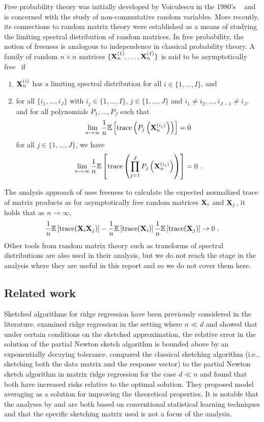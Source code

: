 Free probability theory was initially developed by Voiculescu in the 1980's ~\citep{Anderson:2009} and is concerned with the study of non-commutative random variables. More recently, its connections to random matrix theory were established as a means of studying the limiting spectral distribution of random matrices. In free probability, the notion of freeness is analogous to independence in classical probability theory. A family of random $n\times n$ matrices $\{\mathbf{X}_n^{(1)},\ldots,\mathbf{X}_n^{(I)}\}$ is said to be asymptotically free~\citep{Couillet:2011_free} if
\begin{enumerate}
\item
$\mathbf{X}_n^{(i)}$ has a limiting spectral distribution for all $i\in\{1,\ldots,I\}$, and
\item
for all $\{i_1,\ldots,i_J\}$ with $i_j\in\{1,\ldots,I\}$, $j\in\{1,\ldots,J\}$ and $i_1\neq i_2,\ldots,i_{J-1}\neq i_J$, and for all polynomials $P_1,\ldots,P_J$ such that
\[
\lim_{n\rightarrow\infty} \frac{1}{n}\mathbb{E}\left[\mathrm{trace}\left(P_j\left(\mathbf{X}_n^{(i_j)}\right)\right)\right] = 0
\]
for all $j\in\{1,\ldots,J\}$, we have
\[
\lim_{n\rightarrow\infty} \frac{1}{n}\mathbb{E}\left[\mathrm{trace}\left(\prod_{j=1}^JP_j\left(\mathbf{X}_n^{(i_j)}\right)\right)\right] = 0 \;.
\]
\end{enumerate}
The analysis approach of \citet{Lacotte:2020} uses freeness to calculate the expected normalized trace of matrix products as for asymptotically free random matrices $\mathbf{X}_i$ and $\mathbf{X}_j$, it holds that as $n\rightarrow\infty$,
\[
\frac{1}{n}\mathbb{E}\left[\mathrm{trace}(\mathbf{X}_i\mathbf{X}_j)\right] - \frac{1}{n}\mathbb{E}\left[\mathrm{trace}(\mathbf{X}_i)\right]\frac{1}{n}\mathbb{E}\left[\mathrm{trace}(\mathbf{X}_j)\right] \rightarrow 0 \;.
\]
Other tools from random matrix theory such as transforms of spectral distributions are also used in their analysis, but we do not reach the stage in the analysis where they are useful in this report and so we do not cover them here. \todo


\subsection{Related work} \label{sec:literature}

Sketched algorithms for ridge regression have been previously considered in the literature. \citet{Chowdhury:2018} examined ridge regression in the setting where $n\ll d$ and showed that under certain conditions on the sketched approximation, the relative error in the solution of the partial Newton sketch algorithm is bounded above by an exponentially decaying tolerance. \citet{Wang:2017} compared the classical sketching algorithm (i.e., sketching both the data matrix and the response vector) to the partial Newton sketch algorithm in matrix ridge regression for the case $d\ll n$ and found that both have increased risks relative to the optimal solution. They proposed model averaging as a solution for improving the theoretical properties. It is notable that the analyses by \citet{Chowdhury:2018} and \citet{Wang:2017} are both based on conventional statistical learning techniques and that the specific sketching matrix used is not a focus of the analysis.
\\

